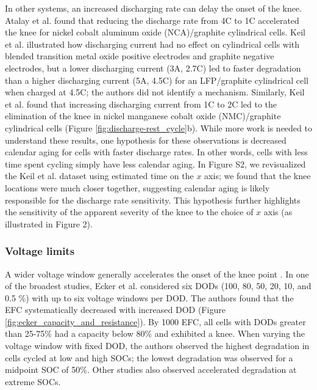 \documentclass[journal=jpclcd,manuscript=article]{achemso}
\begin{document}
In other systems, an increased discharging rate can delay the onset of the knee.
Atalay et al.\cite{atalay_theory_2020} found that reducing the discharge rate from 4C to 1C accelerated the knee for nickel cobalt aluminum oxide (NCA)/graphite cylindrical cells.
Keil et al.\cite{keil_charging_2016} illustrated how discharging current had no effect on cylindrical cells with blended transition metal oxide positive electrodes and graphite negative electrodes, but a lower discharging current (3A, 2.7C) led to faster degradation than a higher discharging current (5A, 4.5C) for an LFP/graphite cylindrical cell when charged at 4.5C; the authors did not identify a mechanism. 
Similarly, Keil et al.\cite{keil_linear_2019} found that increasing discharging current from 1C to 2C led to the elimination of the knee in nickel manganese cobalt oxide (NMC)/graphite cylindrical cells (Figure \ref{fig:discharge-rest_cycle}b).
While more work is needed to understand these results, one hypothesis for these observations is decreased calendar aging for cells with faster discharge rates.
In other words, cells with less time spent cycling simply have less calendar aging. In Figure S2, we revisualized the Keil et al.\cite{keil_linear_2019} dataset using estimated time on the $x$ axis; we found that the knee locations were much closer together, suggesting calendar aging is likely responsible for the discharge rate sensitivity. This hypothesis further highlights the sensitivity of the apparent severity of the knee to the choice of $x$ axis (as illustrated in Figure 2).

\subsubsection{Voltage limits} 
A wider voltage window generally accelerates the onset of the knee point \cite{ecker_calendar_2014, pfrang_long-term_2018, klett_non-uniform_2014, ma_novel_2019, petzl_lithium_2015, schuster_nonlinear_2015}. In one of the broadest studies, Ecker et al. \cite{ecker_calendar_2014} considered six DODs (100, 80, 50, 20, 10, and 0.5 \%) with up to six voltage windows per DOD. The authors found that the EFC systematically decreased with increased DOD (Figure \ref{fig:ecker_capacity_and_resistance}). By 1000 EFC, all cells with DODs greater than 25-75\% had a capacity below 80\% and exhibited a knee. When varying the voltage window with fixed DOD, the authors observed the highest degradation in cells cycled at low and high SOCs; the lowest degradation was observed for a midpoint SOC of 50\%. Other studies also observed accelerated degradation at extreme SOCs. \cite{aiken_accelerated_2020,ma_novel_2019, zhu_investigation_2021}
\end{document}
